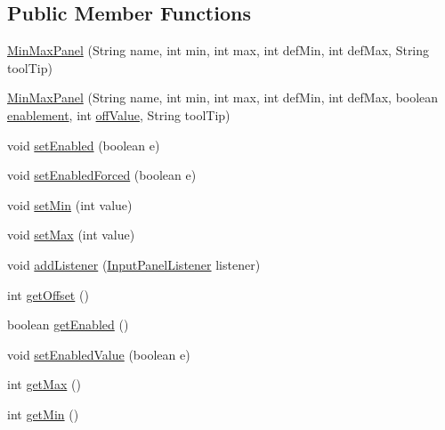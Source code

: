 \subsection*{Public Member Functions}
\begin{DoxyCompactItemize}
\item 
\mbox{\hyperlink{classorg_1_1newdawn_1_1slick_1_1tools_1_1peditor_1_1_min_max_panel_a1dab7426b0c3b5d05eb3ecfaf3693158}{Min\+Max\+Panel}} (String name, int min, int max, int def\+Min, int def\+Max, String tool\+Tip)
\item 
\mbox{\hyperlink{classorg_1_1newdawn_1_1slick_1_1tools_1_1peditor_1_1_min_max_panel_a1f711303b9369f055b1540ad6004a76a}{Min\+Max\+Panel}} (String name, int min, int max, int def\+Min, int def\+Max, boolean \mbox{\hyperlink{classorg_1_1newdawn_1_1slick_1_1tools_1_1peditor_1_1_min_max_panel_a82cdf912c2f081581d288b771c431703}{enablement}}, int \mbox{\hyperlink{classorg_1_1newdawn_1_1slick_1_1tools_1_1peditor_1_1_min_max_panel_a5abd0ceb9a2307cef6de8fbade8039db}{off\+Value}}, String tool\+Tip)
\item 
void \mbox{\hyperlink{classorg_1_1newdawn_1_1slick_1_1tools_1_1peditor_1_1_min_max_panel_a2c266f8a36221ca788e748726349c9ec}{set\+Enabled}} (boolean e)
\item 
void \mbox{\hyperlink{classorg_1_1newdawn_1_1slick_1_1tools_1_1peditor_1_1_min_max_panel_aeef464cdd41c692e0d674b91d3c0b687}{set\+Enabled\+Forced}} (boolean e)
\item 
void \mbox{\hyperlink{classorg_1_1newdawn_1_1slick_1_1tools_1_1peditor_1_1_min_max_panel_af0431110deccd05c43e767dbc04cf9b8}{set\+Min}} (int value)
\item 
void \mbox{\hyperlink{classorg_1_1newdawn_1_1slick_1_1tools_1_1peditor_1_1_min_max_panel_a3beee34aaf43d6a97e842d563edc0ce0}{set\+Max}} (int value)
\item 
void \mbox{\hyperlink{classorg_1_1newdawn_1_1slick_1_1tools_1_1peditor_1_1_min_max_panel_a734de4650f9d14151af09fa6733e8150}{add\+Listener}} (\mbox{\hyperlink{interfaceorg_1_1newdawn_1_1slick_1_1tools_1_1peditor_1_1_input_panel_listener}{Input\+Panel\+Listener}} listener)
\item 
int \mbox{\hyperlink{classorg_1_1newdawn_1_1slick_1_1tools_1_1peditor_1_1_min_max_panel_a58840fac9d2ca629b3a8149042c405fd}{get\+Offset}} ()
\item 
boolean \mbox{\hyperlink{classorg_1_1newdawn_1_1slick_1_1tools_1_1peditor_1_1_min_max_panel_a35eed7db79e8c6b3f69b0a58e64d5910}{get\+Enabled}} ()
\item 
void \mbox{\hyperlink{classorg_1_1newdawn_1_1slick_1_1tools_1_1peditor_1_1_min_max_panel_a554148dcd8bb5b5bf6a91194f65f679b}{set\+Enabled\+Value}} (boolean e)
\item 
int \mbox{\hyperlink{classorg_1_1newdawn_1_1slick_1_1tools_1_1peditor_1_1_min_max_panel_ad7a04168e42375f9bb72fd34712858cc}{get\+Max}} ()
\item 
int \mbox{\hyperlink{classorg_1_1newdawn_1_1slick_1_1tools_1_1peditor_1_1_min_max_panel_adf479f7a027d743b06f16e54f03f6691}{get\+Min}} ()
\end{DoxyCompactItemize}

